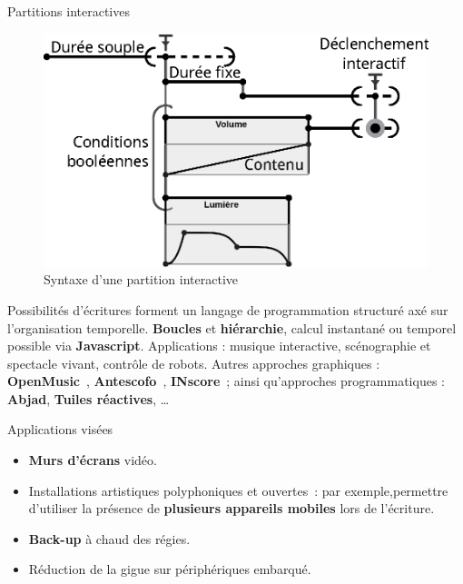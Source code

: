 \begin{block}{Partitions interactives}
\begin{figure}
\includegraphics[width=\columnwidth]{images/score.eps}
\caption{Syntaxe d'une partition interactive}
\end{figure}
Possibilités d'écritures forment un langage de programmation structuré axé sur l'organisation temporelle. 
\textbf{Boucles} et \textbf{hiérarchie}, calcul instantané ou temporel possible via \textbf{Javascript}.
Applications : musique interactive, scénographie et spectacle vivant, contrôle de robots.
Autres approches graphiques : \textbf{OpenMusic}~\cite{bresson_openmusic:_2011}, \textbf{Antescofo}~\cite{cont2008antescofo}, \textbf{INscore}~\cite{fober2012environment}; ainsi qu'approches programmatiques : \textbf{Abjad}, \textbf{Tuiles réactives}, \dots
\end{block}
\begin{block}{Applications visées}
    \begin{itemize}
        \item \textbf{Murs d'écrans} vidéo.
        \item Installations artistiques polyphoniques et ouvertes~: 
        par exemple,permettre d'utiliser la présence de \textbf{plusieurs appareils mobiles} 
        lors de l'écriture.
        \item \textbf{Back-up} à chaud des régies.
        \item Réduction de la gigue sur périphériques embarqué.
    \end{itemize}
\end{block}